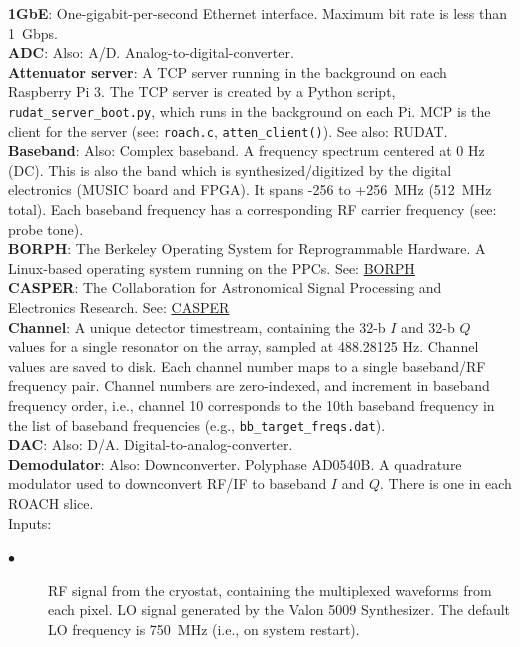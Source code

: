 \noindent
\textbf{1GbE}: One-gigabit-per-second Ethernet interface. Maximum bit rate is less than 1~Gbps.\\
\textbf{ADC}: Also: A/D. Analog-to-digital-converter.\\
\textbf{Attenuator server}: A TCP server running in the background on each Raspberry Pi 3. The TCP server is created by a Python script, \texttt{rudat\_server\_boot.py}, which runs in the background on each Pi. MCP is the client for the server (see: \texttt{roach.c}, \texttt{atten\_client()}). See also: RUDAT.\\
\textbf{Baseband}: Also: Complex baseband. A frequency spectrum centered at 0 Hz (DC). This is also the band which is synthesized/digitized by the digital electronics (MUSIC board and FPGA). It spans -256 to +256~MHz (512~MHz total). Each baseband frequency has a corresponding RF carrier frequency (see: probe tone).\\
\textbf{BORPH}: The Berkeley Operating System for Reprogrammable Hardware. A Linux-based operating system running on the PPCs. See: \href{https://casper.ssl.berkeley.edu/wiki/BORPH}{BORPH}\\
\textbf{CASPER}: The Collaboration for Astronomical Signal Processing and Electronics Research. See: \href{https://casper.berkeley.edu}{CASPER}\\
\textbf{Channel}: A unique detector timestream, containing the 32-b $I$ and 32-b $Q$ values for a single resonator on the array, sampled at 488.28125 Hz. Channel values are saved to disk. Each channel number maps to a single baseband/RF frequency pair. Channel numbers are zero-indexed, and increment in baseband frequency order, i.e., channel 10 corresponds to the 10th baseband frequency in the list of baseband frequencies (e.g., \texttt{bb\_target\_freqs.dat}).\\
\textbf{DAC}: Also: D/A. Digital-to-analog-converter.\\
\textbf{Demodulator}: Also: Downconverter. Polyphase AD0540B. A quadrature modulator used to downconvert RF/IF to baseband $I$ and $Q$. There is one in each ROACH slice.\\
Inputs:
\begin{description}
  \item[$\bullet$] RF signal from the cryostat, containing the multiplexed waveforms from each pixel. LO signal generated by the Valon 5009 Synthesizer. The default LO frequency is 750~MHz (i.e., on system restart).
\end{description}
